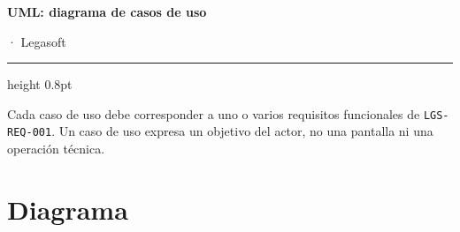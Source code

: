 \documentclass[11pt,a4paper]{article}
\begin{document}
\begin{center}
{\sffamily\bfseries\LARGE\color{lgPrimario} UML: diagrama de casos de uso\par}
\vspace{2pt}
{\sffamily\normalsize\color{lgGris}  · Legasoft\par}
\end{center}
\vspace{6pt}
{\color{lgBorde}\hrule height 0.8pt}
\vspace{10pt}

\begin{porcompletar}
Cada caso de uso debe corresponder a uno o varios requisitos funcionales de
\texttt{LGS-REQ-001}. Un caso de uso expresa un objetivo del actor, no una
pantalla ni una operación técnica.
\end{porcompletar}

\section*{Diagrama}
\end{document}
